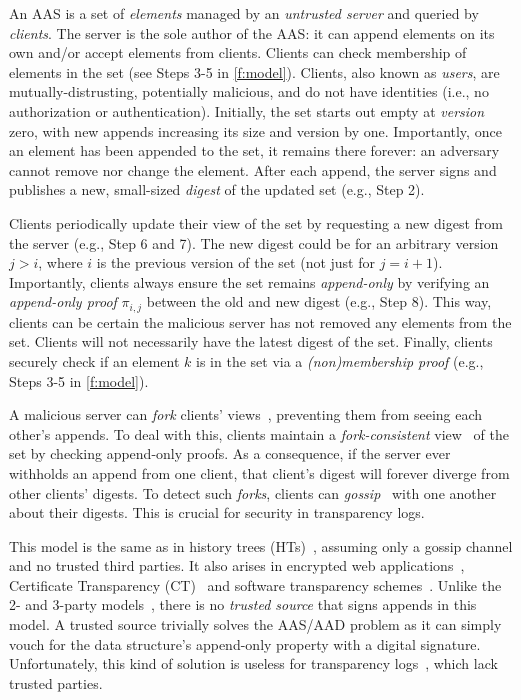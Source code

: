 An AAS is a set of \textit{elements} managed by an \textit{untrusted server} and queried by \textit{clients}.
The server is the sole author of the AAS: it can append elements on its own and/or accept elements from clients.
Clients can check membership of elements in the set (see Steps 3-5 in \cref{f:model}).
Clients, also known as \textit{users}, are mutually-distrusting, potentially malicious, and do not have identities (i.e., no authorization or authentication).
Initially, the set starts out empty at \textit{version} zero, with new appends increasing its size and version by one.
Importantly, once an element has been appended to the set, it remains there forever: an adversary cannot remove nor change the element.
After each append, the server signs and publishes a new, small-sized \emph{digest} of the updated set (e.g., Step 2).

Clients periodically update their view of the set by requesting a new digest from the server (e.g., Step 6 and 7).
The new digest could be for an arbitrary version $j > i$, where $i$ is the previous version of the set (not just for $j = i+1$).
Importantly, clients always ensure the set remains \textit{append-only} by verifying an \textit{append-only proof} $\pi_{i,j}$ between the old and new digest (e.g., Step 8).
This way, clients can be certain the malicious server has not removed any elements from the set.
Clients will not necessarily have the latest digest of the set.
Finally, clients securely check if an element $k$ is in the set via a \emph{(non)membership proof} (e.g., Steps 3-5 in \cref{f:model}).

A malicious server can \emph{fork} clients' views~\cite{LKMS04}, preventing them from seeing each other's appends.
To deal with this, clients maintain a \textit{fork-consistent} view~\cite{LM07Beyond,LKMS04} of the set by checking append-only proofs.
As a consequence, if the server ever withholds an append from one client, that client's digest will forever diverge from other clients' digests.
To detect such \textit{forks}, clients can \textit{gossip}~\cite{CSP+15,STV+16,TD17,DPV+18} with one another about their digests.
This is crucial for security in transparency logs.

This model is the same as in history trees (HTs)~\cite{ht}, assuming only a gossip channel and no trusted third parties.
It also arises in encrypted web applications~\cite{mylar,verena,frientegrity}, Certificate Transparency (CT)~\cite{ct} and software transparency schemes~\cite{at,chainiac}.
Unlike the 2- and 3-party models~\cite{two-party-ad,pads,balloon}, there is no \textit{trusted source} that signs appends in this model.
A trusted source trivially solves the AAS/AAD problem as it can simply vouch for the data structure's append-only property with a digital signature.
Unfortunately, this kind of solution is useless for transparency logs~\cite{ct,Ryan2014,coniks}, which lack trusted parties.
